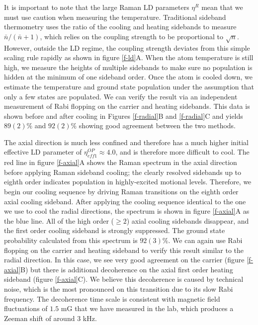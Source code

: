\documentclass[aps,prl,twocolumn,groupedaddress]{revtex4-1}
\begin{document}
It is important to note that the large Raman LD parameters $\eta^R$ mean that
we must use caution when measuring the temperature.
Traditional sideband thermometry uses
the ratio of the cooling and heating sidebands to measure $\bar n / (\bar n + 1)$, which relies
on the coupling strength to be proportional to $\sqrt{n}$. However, outside the
LD regime, the coupling strength deviates from this simple scaling rule rapidly as
shown in figure \ref{f-ld}A.
When the atom temperature is still high,
we measure the heights of multiple sidebands to make sure no population is hidden at the
minimum of one sideband order. Once the atom is cooled down, we estimate the temperature
and ground state population under the assumption that only a few states are populated.
We can verify the result via an independent measurement of Rabi flopping on the carrier and heating
sidebands. This data is shown before and after cooling in Figures
\ref{f-radial}B and \ref{f-radial}C and yields $89(2)\%$ and $92(2)\%$
showing good agreement between the two methods.

The axial direction is much less confined and therefore has a much higher initial effective
LD parameter of $\eta^{OP}_{eff1}\approx 4.0$, and is therefore more difficult to cool.
The red line in figure \ref{f-axial}A shows the Raman spectrum in the axial direction
before applying Raman sideband cooling; the clearly resolved sidebands
up to eighth order indicates population in highly-excited motional levels.
Therefore, we begin our cooling sequence by driving Raman transitions on the eighth order axial
cooling sideband. After applying the cooling sequence identical to the one we use to cool
the radial directions, the spectrum is shown in figure \ref{f-axial}A as the blue line.
All of the high order ($\geqslant2$) axial cooling sidebands disappear, and the first order
cooling sideband is strongly suppressed.
The ground state probability calculated from this spectrum is $92(3)\%$.
We can again use Rabi flopping on the carrier and heating sideband to verify this result
similar to the radial direction. In this case, we see very good agreement on the carrier
(figure \ref{f-axial}B) but there is additional decoherence on the axial first order
heating sideband (figure \ref{f-axial}C).
We believe this decoherence is caused by technical noise, which is the most pronounced
on this transition due to its slow Rabi frequency.
The decoherence time scale is consistent with magnetic field fluctuations of $1.5$ mG that we have measured in the lab, which produces
a Zeeman shift of around $3$ kHz.
\end{document}
